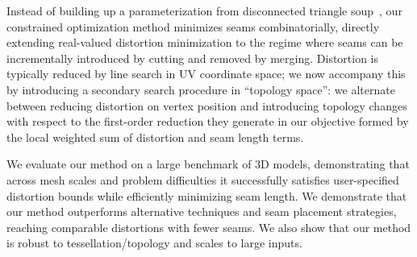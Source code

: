 %
%
Instead of building up a parameterization from disconnected triangle soup~\cite{Poranne2017Autocuts}, our constrained optimization method minimizes seams combinatorially, directly extending real-valued distortion minimization to the regime where seams can be incrementally introduced by cutting and removed by merging. Distortion is typically reduced by line search in UV coordinate space; we now accompany this by introducing a secondary search procedure in ``topology space'': we alternate between reducing distortion on vertex position and introducing topology changes with respect to the first-order reduction they generate in our objective formed by the local weighted sum of distortion and seam length terms. %


We evaluate our method on a large benchmark of 3D models, demonstrating that across mesh scales and problem difficulties it successfully satisfies user-specified distortion bounds while efficiently minimizing seam length. We demonstrate that our method outperforms alternative techniques and seam placement strategies, reaching comparable distortions with fewer seams. We also show that our method is robust to tessellation/topology and scales to large inputs.%

